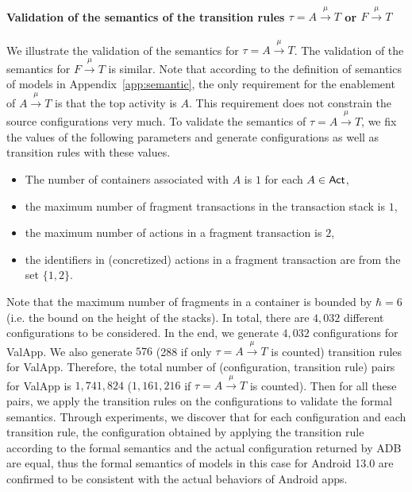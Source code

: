 \paragraph{Validation of the semantics of the transition rules $\tau = A \xrightarrow{\mu} T$ or $F \xrightarrow{\mu} T$}
We illustrate the validation of the semantics for $\tau = A \xrightarrow{\mu} T$. The validation of the semantics for $F \xrightarrow{\mu} T$ is similar. 
Note that according to the definition of semantics of {\AMASS} models in Appendix~\ref{app:semantic}, the only requirement for the enablement of $A \xrightarrow{\mu} T$ is that the top activity is $A$. This requirement does not constrain the source configurations very much. 
To validate the semantics of $\tau = A \xrightarrow{\mu} T$, we fix the values of the following parameters and generate configurations as well as transition rules with these values.
\begin{itemize}
%
\item The number of containers associated with $A$ is $1$ for each $A\in{\sf Act}$, 
%
\item the maximum number of fragment transactions in the transaction stack is $1$, 
%
\item the maximum number of actions in a fragment transaction is $2$, 
%
%
\item the identifiers in (concretized)  actions in a  fragment transaction are from the set $\{1,2\}$.
% 
\end{itemize}
Note that the maximum number of fragments in a container is bounded by $\hbar = 6$ (i.e. the bound on the height of the stacks).  
In total, there are $4,032$ %
different configurations to be considered. 
In the end, we generate $4,032$ configurations for ValApp. 
We also generate $576$ (288 if only  $\tau = A \xrightarrow{\mu} T$ is counted) 
%
transition rules for ValApp. 
Therefore, the total number of (configuration, transition rule) pairs for ValApp is $1,741,824$ ($1,161,216$ if $\tau = A \xrightarrow{\mu} T$ is counted). 
Then for all these pairs, we apply the transition rules on the configurations to validate the formal semantics. Through experiments, we discover that for each configuration and each transition rule, the configuration obtained by applying the transition rule according to the formal semantics and the actual configuration returned by ADB are equal, thus the formal semantics of {\AMASS} models in this case for Android 13.0 are confirmed to be consistent with the actual behaviors of Android apps.  

